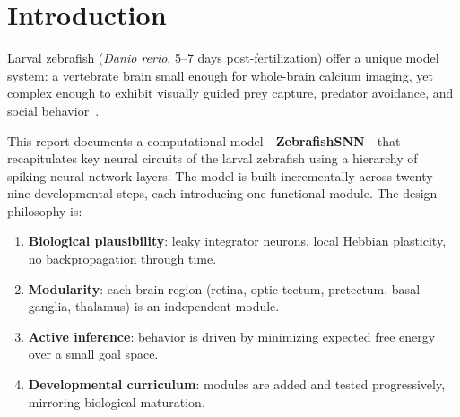 \documentclass[11pt,a4paper]{article}
\begin{document}
\begin{abstract}
color vision with UV/B/G/R opponent channels (Step~39), a 2000-step
circadian clock with crepuscular foraging peaks (Step~40), proprioceptive
command--actual prediction error with collision detection (Step~41), and
an insula module integrating heart rate, arousal, and emotional valence
(Step~42).
Step~43 adds three-factor reward-modulated STDP~\cite{fremaux2016} to all
deep feedforward synapses, reviving the quiescent PC\_int layer
(RMS $0.002 \to {>}0.01$) and implementing a biologically plausible
reinforcement learning rule within the predictive coding hierarchy.
Steps~44--45 refine behavioral precision: Step~44 improves ground-truth
danger-zone detection and detour planning; Step~45 fixes the flee orbit
bug and introduces targeted goal-arbitration interventions (PATROL
predator bias, food-visible FORAGE reflex, STALK lateral avoidance, HUNT
sprint continuity) that raise overall decision quality to 89/100
\textsc{rational} (A=100, B=85, C=80, D=100, E=79).
In closed-loop simulations, the virtual zebrafish successfully forages for
food, avoids predators with biologically realistic escape responses,
navigates around rock formations using motor primitives, and explores
its environment with goal-appropriate behavioral modulation driven by
interoceptive and exteroceptive signals.
\end{abstract}

\tableofcontents
\newpage

\section{Introduction}\label{sec:intro}

Larval zebrafish (\textit{Danio rerio}, 5--7 days post-fertilization) offer a
unique model system: a vertebrate brain small enough for whole-brain calcium
imaging, yet complex enough to exhibit visually guided prey capture, predator
avoidance, and social behavior~\cite{ahrens2013,portugues2014}.

This report documents a computational model---\textbf{ZebrafishSNN}---that
recapitulates key neural circuits of the larval zebrafish using a hierarchy of
spiking neural network layers.
The model is built incrementally across twenty-nine developmental steps, each
introducing one functional module.
The design philosophy is:
\begin{enumerate}[nosep]
  \item \textbf{Biological plausibility}: leaky integrator neurons, local
    Hebbian plasticity, no backpropagation through time.
  \item \textbf{Modularity}: each brain region (retina, optic tectum,
    pretectum, basal ganglia, thalamus) is an independent module.
  \item \textbf{Active inference}: behavior is driven by minimizing expected
    free energy over a small goal space.
  \item \textbf{Developmental curriculum}: modules are added and tested
    progressively, mirroring biological maturation.
\end{enumerate}
\end{document}
